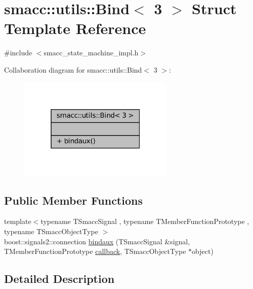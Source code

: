 \hypertarget{structsmacc_1_1utils_1_1Bind_3_013_01_4}{}\section{smacc\+:\+:utils\+:\+:Bind$<$ 3 $>$ Struct Template Reference}
\label{structsmacc_1_1utils_1_1Bind_3_013_01_4}


{\ttfamily \#include $<$smacc\+\_\+state\+\_\+machine\+\_\+impl.\+h$>$}



Collaboration diagram for smacc\+:\+:utils\+:\+:Bind$<$ 3 $>$\+:
\nopagebreak
\begin{figure}[H]
\begin{center}
\leavevmode
\includegraphics[width=211pt]{structsmacc_1_1utils_1_1Bind_3_013_01_4__coll__graph}
\end{center}
\end{figure}
\subsection*{Public Member Functions}
\begin{DoxyCompactItemize}
\item 
{\footnotesize template$<$typename T\+Smacc\+Signal , typename T\+Member\+Function\+Prototype , typename T\+Smacc\+Object\+Type $>$ }\\boost\+::signals2\+::connection \hyperlink{structsmacc_1_1utils_1_1Bind_3_013_01_4_a8958f16a2a40b187e6500a76cfaeed63}{bindaux} (T\+Smacc\+Signal \&signal, T\+Member\+Function\+Prototype \hyperlink{3_2servers_2opencv__perception__node_2opencv__perception__node_8cpp_a050e697bd654facce10ea3f6549669b3}{callback}, T\+Smacc\+Object\+Type $\ast$object)
\end{DoxyCompactItemize}


\subsection{Detailed Description}
